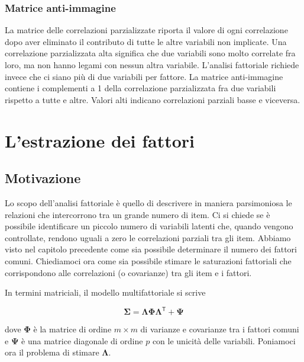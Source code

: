 \documentclass[
  11pt,
]{krantz}
\theoremstyle{definition}
\theoremstyle{definition}
\theoremstyle{definition}
\theoremstyle{definition}
\theoremstyle{remark}
\begin{document}
\hypertarget{matrice-anti-immagine}{%
\subsection{Matrice anti-immagine}\label{matrice-anti-immagine}}

La matrice delle correlazioni parzializzate riporta il valore di ogni correlazione dopo aver eliminato il contributo di tutte le altre variabili non implicate. Una correlazione parzializzata alta significa che due variabili sono molto correlate fra loro, ma non hanno legami con nessun altra variabile. L'analisi fattoriale richiede invece che ci siano più di due variabili per fattore. La matrice anti-immagine contiene i complementi a 1 della correlazione parzializzata fra due variabili rispetto a tutte e altre. Valori alti indicano correlazioni parziali basse e viceversa.

\hypertarget{ch:estrazione}{%
\chapter{L'estrazione dei fattori}\label{ch:estrazione}}

\hypertarget{motivazione}{%
\section*{Motivazione}\label{motivazione}}


Lo scopo dell'analisi fattoriale è quello di descrivere in maniera parsimoniosa le relazioni che intercorrono tra un grande numero di item. Ci si chiede se è possibile identificare un piccolo numero di variabili latenti che, quando vengono controllate, rendono uguali a zero le correlazioni parziali tra gli item. Abbiamo visto nel capitolo precedente come sia possibile determinare il numero dei fattori comuni. Chiediamoci ora come sia possibile stimare le saturazioni fattoriali che corrispondono alle correlazioni (o covarianze) tra gli item e i fattori.

In termini matriciali, il modello multifattoriale si scrive

\[
\boldsymbol{\Sigma} =\boldsymbol{\Lambda} \boldsymbol{\Phi} \boldsymbol{\Lambda}^{\mathsf{T}} + \boldsymbol{\Psi} 
\]

dove \(\boldsymbol{\Phi}\) è la matrice di ordine \(m \times m\) di varianze e covarianze tra i fattori comuni e \(\boldsymbol{\Psi}\) è una matrice diagonale di ordine \(p\) con le unicità delle variabili. Poniamoci ora il problema di stimare \(\boldsymbol{\Lambda}\).
\end{document}
